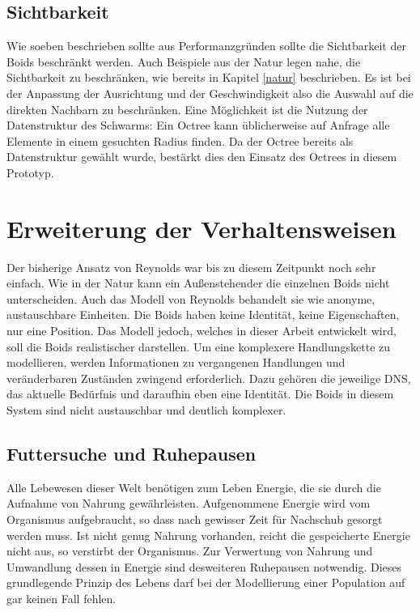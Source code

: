 \documentclass[draft=false
              ,paper=a4
              ,twoside=false
              ,fontsize=11pt
              ,headsepline
              ,BCOR10mm
              ,DIV11
              ,bibtotoc
              ,liststotoc
              ]{scrbook}
\begin{document}
\subsection{Sichtbarkeit}
Wie soeben beschrieben sollte aus Performanzgründen sollte die Sichtbarkeit der Boids beschränkt werden. Auch Beispiele aus der Natur legen nahe, die Sichtbarkeit zu beschränken, wie bereits in Kapitel \ref{natur} beschrieben. Es ist bei der Anpassung der Ausrichtung und der Geschwindigkeit also die Auswahl auf die direkten Nachbarn zu beschränken. Eine Möglichkeit ist die Nutzung der Datenstruktur des Schwarms: Ein Octree kann üblicherweise auf Anfrage alle Elemente in einem gesuchten Radius finden. Da der Octree bereits als Datenstruktur gewählt wurde, bestärkt dies den Einsatz des Octrees in diesem Prototyp.
\section{Erweiterung der Verhaltensweisen}
Der bisherige Ansatz von Reynolds war bis zu diesem Zeitpunkt noch sehr einfach. Wie in der Natur kann ein Außenstehender die einzelnen Boids nicht unterscheiden. Auch das Modell von Reynolds behandelt sie wie anonyme, austauschbare Einheiten. Die Boids haben keine Identität, keine Eigenschaften, nur eine Position. Das Modell jedoch, welches in dieser Arbeit entwickelt wird, soll die Boids realistischer darstellen. Um eine komplexere Handlungskette zu modellieren, werden Informationen zu vergangenen Handlungen und veränderbaren Zuständen zwingend erforderlich. Dazu gehören die jeweilige DNS, das aktuelle Bedürfnis und daraufhin eben eine Identität. Die Boids in diesem System sind nicht austauschbar und deutlich komplexer.
\subsection{Futtersuche und Ruhepausen}
Alle Lebewesen dieser Welt benötigen zum Leben Energie, die sie durch die Aufnahme von Nahrung gewährleisten. Aufgenommene Energie wird vom Organismus aufgebraucht, so dass nach gewisser Zeit für Nachschub gesorgt werden muss. Ist nicht genug Nahrung vorhanden, reicht die gespeicherte Energie nicht aus, so verstirbt der Organismus. Zur Verwertung von Nahrung und Umwandlung dessen in Energie sind desweiteren Ruhepausen notwendig. Dieses grundlegende Prinzip des Lebens darf bei der Modellierung einer Population auf gar keinen Fall fehlen.
\end{document}
